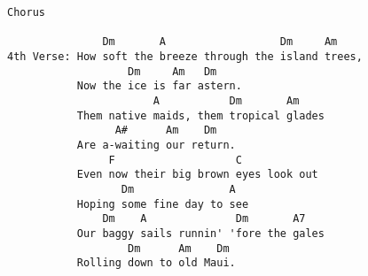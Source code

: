 \documentclass[leqno]{memoir}
\begin{document}
\begin{verbatim}
Chorus

               Dm       A                  Dm     Am
4th Verse: How soft the breeze through the island trees,
                   Dm     Am   Dm
           Now the ice is far astern.
                       A           Dm       Am
           Them native maids, them tropical glades
                 A#      Am    Dm
           Are a-waiting our return.
                F                   C
           Even now their big brown eyes look out
                  Dm               A
           Hoping some fine day to see
               Dm    A              Dm       A7
           Our baggy sails runnin' 'fore the gales
                   Dm      Am    Dm
           Rolling down to old Maui.
\end{verbatim}
\newpage
\end{document}
